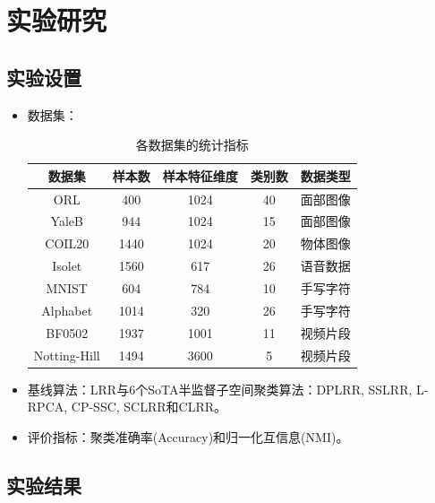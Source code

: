 \documentclass{beamer}
\begin{document}
\section{实验研究}

\subsection{实验设置}

\begin{frame}
\begin{itemize}
\item 数据集：

\begin{table}[H]
    \scriptsize
	\renewcommand{\arraystretch}{1.1}
	\caption{各数据集的统计指标}
        \vspace{-0.4cm}
	\label{table_1}
	\centering
	\begin{tabular}{ccccc}
		\hline
		数据集 & 样本数 & 样本特征维度 & 类别数 & 数据类型\\
		\hline
        ORL & 400 & 1024 & 40 & 面部图像\\
        YaleB & 944 & 1024 & 15 & 面部图像\\
        COIL20 & 1440 & 1024 & 20 & 物体图像\\
        Isolet & 1560 & 617 & 26 & 语音数据\\
        MNIST & 604 & 784 & 10 & 手写字符\\
        Alphabet & 1014 & 320 & 26 & 手写字符\\
            BF0502 & 1937 & 1001 & 11 & 视频片段\\
          Notting-Hill & 1494 & 3600 & 5 & 视频片段\\
		\hline
	\end{tabular}
\end{table}

\item 基线算法：LRR与6个SoTA半监督子空间聚类算法：DPLRR, SSLRR, L-RPCA, CP-SSC, SCLRR和CLRR。

\item 评价指标：聚类准确率(Accuracy)和归一化互信息(NMI)。

\end{itemize}
\end{frame}

\subsection{实验结果}
\end{document}
